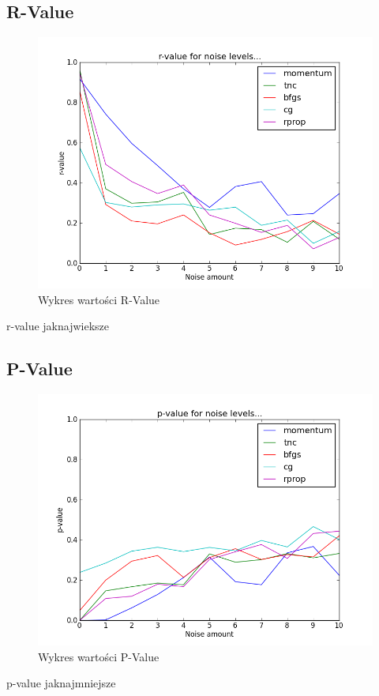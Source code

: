 \documentclass[a4paper]{article}
\begin{document}
\subsection{R-Value}
\begin{figure}[pht]
 \centering
 \includegraphics[scale=0.5]{../compare_plots/compare_plot_r_value}
 \caption{Wykres wartości R-Value}\label{rys:plot1}
\end{figure}
r-value jaknajwieksze

\subsection{P-Value}
\begin{figure}[pht]
 \centering
 \includegraphics[scale=0.5]{../compare_plots/compare_plot_p_value}
 \caption{Wykres wartości P-Value}\label{rys:plot1}
\end{figure}
p-value jaknajmniejsze
\end{document}

